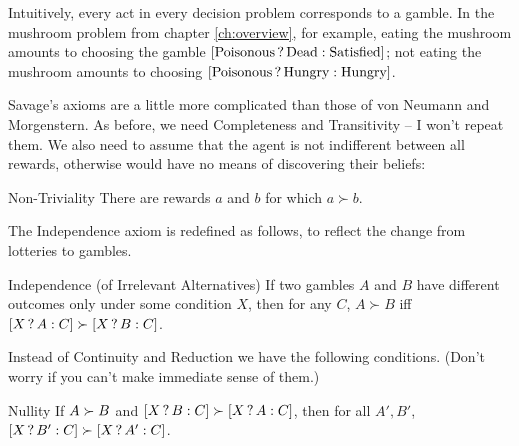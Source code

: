 Intuitively, every act in every decision problem corresponds to a gamble. In the
mushroom problem from chapter \ref{ch:overview}, for example, eating the
mushroom amounts to choosing the gamble
$[\text{Poisonous}\,?\, \text{Dead} :\text{Satisfied}]$; not eating the mushroom
amounts to choosing $[\text{Poisonous}\,?\, \text{Hungry} :\text{Hungry}]$.

Savage's axioms are a little more complicated than those of von Neumann and
Morgenstern. As before, we need Completeness and Transitivity -- I won't repeat
them. We also need to assume that the agent is not indifferent between all
rewards, otherwise would have no means of discovering their beliefs:
%
\begin{genericthm}{Non-Triviality}
  There are rewards $a$ and $b$ for which $a\succ b$.
\end{genericthm}

The Independence axiom is redefined as follows, to reflect the change from
lotteries to gambles.
%
\begin{genericthm}{Independence (of Irrelevant Alternatives)} 
  If two gambles $A$ and $B$ have different outcomes only under some condition
  $X$, then for any $C$, $A \succ B$ iff $[X\,?\, A :C] \succ [X\,?\, B :C]$.
\end{genericthm}



Instead of Continuity and Reduction we have the following conditions. (Don't
worry if you can't make immediate sense of them.)
%
\begin{genericthm}{Nullity} 
  If $A \succ B$ and $[X\,?\, B :C] \succ [X\,?\, A :C]$, then
  for all $A',B'$, $[X\,?\, B' :C] \succ [X\,?\, A' :C]$.
\end{genericthm}


